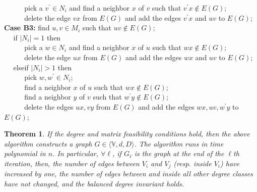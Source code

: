 \documentclass[12pt,a4paper]{article}
\theoremstyle{definition}
\theoremstyle{plain}
\newtheorem{thm}[dfn]{Theorem}
\begin{document}
$~~~~~~~~~~~~~$pick a $v^{\prime} \in N_i$ and find a neighbor $x$ of $v$
such that $v^{\prime}x \notin E(G)$;\\
$~~~~~~~~~~~~~$delete the edge $vx$ from $E(G)$
and add the edges $v^{\prime}x$ and $uv$ to $E(G)$;\\
{\bf Case B3:} find $u,v\in M_i$
such that $uv \notin E(G)$;\\
$~~~~~~$if $|N_i| = 1$ then\\
$~~~~~~~~~~~~~$pick a $w \in N_i$ and find a neighbor $x$ of $u$
such that $wx \notin E(G)$;\\
$~~~~~~~~~~~~~$delete the edge $ux$ from $E(G)$
and add the edges $wx$ and $uv$ to $E(G)$;\\
$~~~~~~$elseif $|N_i|>1$ then\\
$~~~~~~~~~~~~~$pick $w,w^{\prime} \in N_i$;\\
$~~~~~~~~~~~~~$find a neighbor $x$ of $u$ such that $wx \notin E(G)$;\\
$~~~~~~~~~~~~~$find a neighbor $y$ of $v$ such that $w^{\prime}y\notin E(G)$;\\
$~~~~~~~~~~~~~$delete the edges $ux,vy$ from $E(G)$
and add the edges $wx,uv,w^{\prime}y$ to $E(G)$;


\begin{thm}
\label{them:algorithm1}
If the degree and matrix feasibility conditions hold,
then the above algorithm  
constructs a graph $G\in \langle{\mathbb V},d,D\rangle$.
The algorithm runs in time polynomial in $n$. 
In particular, $\forall {\ell}$, if $G_{\ell}$ is the graph at the end of the  ${\ell}$th 
iteration, 
then, the number of edges between $V_i$ and $V_j$ (resp. inside $V_i$) 
have increased by one, the number of edges between and inside all other 
degree classes have not changed,
and the balanced degree invariant holds.
\end{thm}
\end{document}
